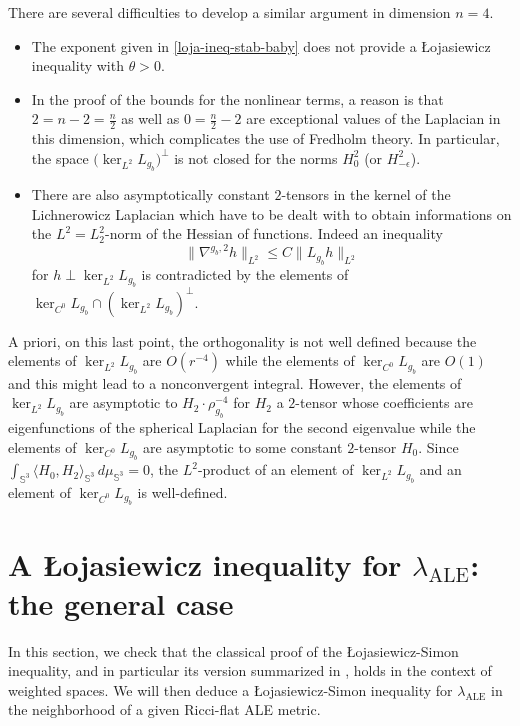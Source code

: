 \documentclass[a4paper,11pt,reqno]{amsart}
\numberwithin{equation}{section}
\begin{document}
	
	There are several difficulties to develop a similar argument in dimension $n=4$. 
	\begin{itemize}
		\item The exponent given in \eqref{loja-ineq-stab-baby} does not provide a \L{}ojasiewicz inequality with $\theta>0$.
		\item In the proof of the bounds for the nonlinear terms, a reason is that $2 = n-2 = \frac{n}{2}$ as well as $0 = \frac{n}{2}-2$ are exceptional values of the Laplacian in this dimension, which complicates the use of Fredholm theory. In particular, the space $\big(\ker_{L^2}L_{g_b}\big)^\perp$ is not closed for the norms $ H^2_0 $ (or $H^2_{-\epsilon}$).
		\item There are also asymptotically constant $2$-tensors in the kernel of the Lichnerowicz Laplacian which have to be dealt with to obtain informations on the $L^2 = L^2_2$-norm of the Hessian of functions. Indeed an inequality $$\|\nabla^{g_b,2}h\|_{L^2}\leq C \|L_{g_b}h\|_{L^2}$$
		for $h\perp \ker_{L^2}L_{g_b}$ is contradicted by the elements of $\ker_{C^0}L_{g_b}\cap (\ker_{L^2}L_{g_b})^\perp$. 
	\end{itemize}
	A priori, on this last point, the orthogonality is not well defined because the elements of $\ker_{L^2}L_{g_b}$ are $O(r^{-4})$ while the elements of $\ker_{C^0}L_{g_b}$ are $O(1)$ and this might lead to a nonconvergent integral. However, the elements of $\ker_{L^2}L_{g_b}$ are asymptotic to $H_2\cdot \rho_{g_b}^{-4}$ for $H_2$ a $2$-tensor whose coefficients are eigenfunctions of the spherical Laplacian for the second eigenvalue while the elements of $\ker_{C^0}L_{g_b}$ are asymptotic to some constant $2$-tensor $H_0$. Since $\int_{\mathbb{S}^3}\langle H_0,H_2\rangle_{\mathbb{S}^3}\, d\mu_{\mathbb{S}^3} = 0$, the $L^2$-product of an element of $\ker_{L^2}L_{g_b}$ and an element of $\ker_{C^0}L_{g_b}$ is well-defined.

	\section{A \L{}ojasiewicz inequality for $\lambda_{\operatorname{ALE}}$: the general case}\label{sec-loja-ineq-gal-case}
	
	In this section, we check that the classical proof of the \L{}ojasiewicz-Simon inequality, and in particular its version summarized in \cite{Col-Min-Ein-Tan-Con}, holds in the context of weighted spaces. We will then deduce a \L{}ojasiewicz-Simon inequality for $\lambda_{\operatorname{ALE}}$ in the neighborhood of a given Ricci-flat ALE metric.
	
\end{document}
